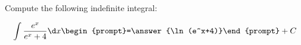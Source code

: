 \documentclass{ximera}
\author{Jim Talamo}
\begin{document}
\begin{exercise}
Compute the following indefinite integral:

\[
\int \frac{e^x}{e^x+4} \d x 
\begin{prompt}=\answer{\ln(e^x+4)}\end{prompt}+C
\]
\end{exercise}
\end{document}
